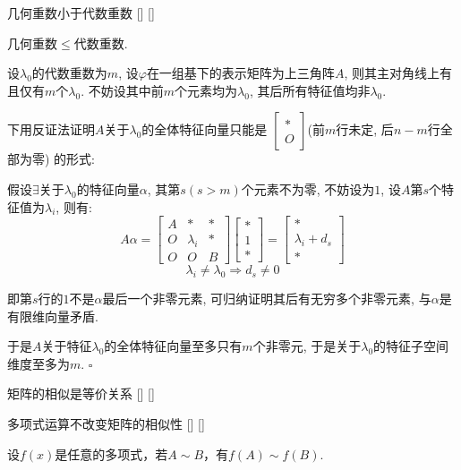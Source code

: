 \documentclass[UTF8]{ctexart}
\begin{document}
		\begin{ppt}
			[]
			{几何重数小于代数重数}
			[]
			[]

			几何重数$\leq$代数重数. 
		\end{ppt}

		\begin{prf}
			设$\lambda_0$的代数重数为$m$, 设$\varphi$在一组基下的表示矩阵为上三角阵$A$, 则其主对角线上有且仅有$m$个$\lambda_0$. 不妨设其中前$m$个元素均为$\lambda_0$, 其后所有特征值均非$\lambda_0$. 

			下用反证法证明$A$关于$\lambda_0$的全体特征向量只能是
			$\begin{bmatrix}
				* \\ O
			\end{bmatrix}$(前$m$行未定, 后$n-m$行全部为零)
			的形式: 

			假设$\exists$关于$\lambda_0$的特征向量$\alpha$, 其第$s(s>m)$个元素不为零, 不妨设为$1$, 设$A$第$s$个特征值为$\lambda_i$, 则有: 
			\[A\alpha=
			\begin{bmatrix}
				A & * & * \\
				O & \lambda_i & * \\
				O & O & B
			\end{bmatrix}
			\begin{bmatrix}
				* \\ 1 \\ *
			\end{bmatrix}=
			\begin{bmatrix}
				* \\ \lambda_i+d_s \\ *
			\end{bmatrix}\]
			\[\lambda_i\neq\lambda_0\Longrightarrow d_s\neq 0\]
			
			即第$s$行的$1$不是$\alpha$最后一个非零元素, 可归纳证明其后有无穷多个非零元素, 与$\alpha$是有限维向量矛盾. 

			于是$A$关于特征$\lambda_0$的全体特征向量至多只有$m$个非零元, 于是关于$\lambda_0$的特征子空间维度至多为$m$. $\square$
		
		\end{prf} 

		\begin{ppt}
			[]
			{矩阵的相似是等价关系}
			[]
			[]
		\end{ppt}

		\begin{ppt}
			[]
			{多项式运算不改变矩阵的相似性}
			[]
			[]

			设$f(x)$是任意的多项式，若$A\sim B$，有$f(A)\sim f(B)$.
		\end{ppt}
\end{document}
